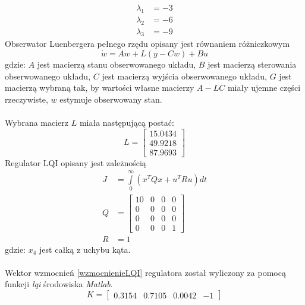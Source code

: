 \begin{equation}
\begin{aligned}
\lambda_1 &= -3\\
\lambda_2 &= -6\\
\lambda_3 &= -9
\end{aligned}
\end{equation}
Obserwator Luenbergera pełnego rzędu opisany jest równaniem różniczkowym
\begin{equation}
\dot w = Aw+L(y-Cw)+Bu
\end{equation}
\noindent gdzie:\newline
\(A\) jest macierzą stanu obserwowanego układu,\newline
\(B\) jest macierzą sterowania obserwowanego układu,\newline
\(C\) jest macierzą wyjścia obserwowanego układu,\newline
\(G\) jest macierzą wybraną tak, by wartości własne macierzy \(A-LC\) miały ujemne części rzeczywiste,\newline
\(w\) estymuje obserwowany stan.
\paragraph*{}
Wybrana macierz \(L\) miała następującą postać:
\begin{equation}
L =
\begin{bmatrix}
15.0434\\
49.9218\\
87.9693
\end{bmatrix}
\end{equation}
%
Regulator LQI opisany jest zależnością 
\begin{equation}
\begin{aligned}
J&=\int\limits_0^{\infty}(x^TQx+u^TRu)dt\\
Q&=\begin{bmatrix}
10 & 0 & 0 & 0\\
0 & 0 & 0 & 0\\
0 & 0 & 0 & 0\\
0 & 0 & 0 & 1
\end{bmatrix}\\
R&=1
\end{aligned}
\end{equation}
\noindent gdzie:\newline
\(x_4\) jest całką z uchybu kąta.\\\\
%
Wektor wzmocnień \ref{wzmocnienieLQI} regulatora został wyliczony za pomocą funkcji \textit{lqi} środowiska \textit{Matlab}.
\begin{equation}
K=\begin{bmatrix}
0.3154 & 0.7105 & 0.0042 & -1
\end{bmatrix}
\label{wzmocnienieLQI}
\end{equation}

